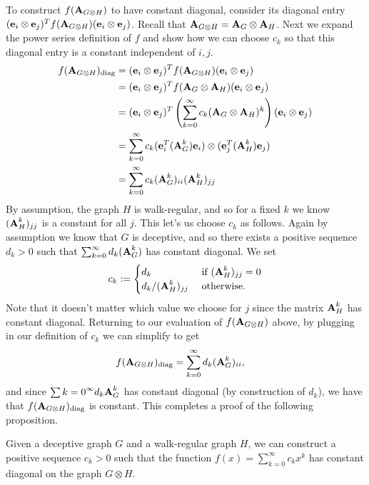 To construct $f(\textbf{A}_{G \otimes H})$ to have constant diagonal, consider its diagonal entry $(\textbf{e}_i \otimes \textbf{e}_j)^T f( \textbf{A}_{G \otimes H}) (\textbf{e}_i \otimes \textbf{e}_j)$. Recall that $\textbf{A}_{G \otimes H} = \textbf{A}_{G} \otimes \textbf{A}_H$. Next we expand the power series definition of $f$ and show how we can choose $c_k$ so that this diagonal entry is a constant independent of $i, j$.
\begin{align}
  f(\textbf{A}_{G \otimes H})_{\textrm{diag}} &= (\textbf{e}_i \otimes \textbf{e}_j)^T f( \textbf{A}_{G \otimes H}) (\textbf{e}_i \otimes \textbf{e}_j) \\
  &= (\textbf{e}_i \otimes \textbf{e}_j)^T f( \textbf{A}_G \otimes \textbf{A}_H) (\textbf{e}_i \otimes \textbf{e}_j) \\
  &= (\textbf{e}_i \otimes \textbf{e}_j)^T \left( \sum_{k=0}^{\infty} c_k (\textbf{A}_{G} \otimes \textbf{A}_H)^k \right) (\textbf{e}_i \otimes \textbf{e}_j) \\
  &= \sum_{k=0}^{\infty} c_k (\textbf{e}_i^T(\textbf{A}_{G}^k)\textbf{e}_i) \otimes (\textbf{e}_j^T(\textbf{A}_H^k)\textbf{e}_j ) \\
  &= \sum_{k=0}^{\infty} c_k (\textbf{A}_{G}^k)_{ii} (\textbf{A}_H^k)_{jj}
\end{align}
By assumption, the graph $H$ is walk-regular, and so for a fixed $k$ we know $(\textbf{A}_H^k)_{jj}$ is a constant for all $j$. This let's us choose $c_k$ as follows.
Again by assumption we know that $G$ is deceptive, and so there exists a positive sequence $d_k > 0$ such that $\sum_{k=0}^{\infty} d_k (\textbf{A}_G^k)$ has constant diagonal.
We set
\[
c_k := \begin{cases}
d_k & \textrm{ if } (\textbf{A}_H^k)_{jj} = 0 \\
d_k/(\textbf{A}_H^k)_{jj} & \textrm{ otherwise.}
\end{cases}
\]
Note that it doesn't matter which value we choose for $j$ since the matrix $\textbf{A}_H^k$ has constant diagonal. Returning to our evaluation of $f(\textbf{A}_{G \otimes H})$ above, by plugging in our definition of $c_k$ we can simplify to get
\begin{align}
  f(\textbf{A}_{G\otimes H})_{\textrm{diag}} &= \sum_{k=0}^{\infty} d_k (\textbf{A}_{G}^k)_{ii},
\end{align}
and since $\sum{k=0}^{\infty}d_k \textbf{A}_G^k$ has constant diagonal (by construction of $d_k$), we have that $f(\textbf{A}_{G\otimes H})_{\textrm{diag}}$ is constant. This completes a proof of the following proposition.

\begin{proposition}
  Given a deceptive graph $G$ and a walk-regular graph $H$, we can construct a positive sequence $c_k > 0$ such that the function $f(x) = \sum_{k=0}^{\infty} c_k x^k$ has constant diagonal on the graph $G \otimes H$.
\end{proposition}

